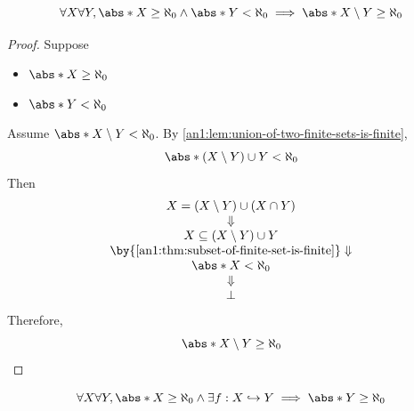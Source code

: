 \begin{theorem} \label{an1:thm:infinite-set-minus-finite-set-is-infinite}
  \[
    \forall X \forall Y, \abs*{X} \geq \aleph_{0} \land \abs*{Y} < \aleph_{0}
    \implies \abs*{X \setminus Y} \geq \aleph_{0}
  \]
\end{theorem}

\begin{proof}
  Suppose
  \begin{itemize}
    \item $\abs*{X} \geq \aleph_{0}$
    \item $\abs*{Y} < \aleph_{0}$
  \end{itemize}
  Assume $\abs*{X \setminus Y} < \aleph_{0}$. By \cref{an1:lem:union-of-two-finite-sets-is-finite},
  \[
    \abs*{(X \setminus Y) \cup Y} < \aleph_{0}
  \]
  Then
  \[
    \begin{array}{c}
      X = (X \setminus Y) \cup (X \cap Y)                           \\
      \Downarrow                                                    \\
      X \subseteq (X \setminus Y) \cup Y                            \\
      \by{\Cref{an1:thm:subset-of-finite-set-is-finite}} \Downarrow \\
      \abs*{X} < \aleph_{0}                                         \\
      \Downarrow                                                    \\
      \bot
    \end{array}
  \]
  Therefore,
  \[
    \abs*{X \setminus Y} \geq \aleph_{0}
  \]
\end{proof}

\begin{theorem} \label{an1:thm:injection-from-infinite-set-implies-infinite}
  \[
    \forall X \forall Y, \abs*{X} \geq \aleph_{0} \land \exists f: X \hookrightarrow Y
    \implies \abs*{Y} \geq \aleph_{0}
  \]
\end{theorem}

